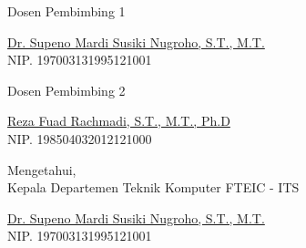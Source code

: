 \begin{center}

  \begin{multicols}{2}

    Dosen Pembimbing 1
    \vspace{12ex}

    \underline{Dr. Supeno Mardi Susiki Nugroho, S.T., M.T.} \\
    NIP. 197003131995121001

    \columnbreak

    Dosen Pembimbing 2
    \vspace{12ex}

    \underline{Reza Fuad Rachmadi, S.T., M.T., Ph.D} \\
    NIP. 198504032012121000

  \end{multicols}
  \vspace{6ex}

  Mengetahui, \\
  Kepala Departemen Teknik Komputer FTEIC - ITS
  \vspace{12ex}

  \underline{Dr. Supeno Mardi Susiki Nugroho, S.T., M.T. } \\
  NIP. 197003131995121001

\end{center}
